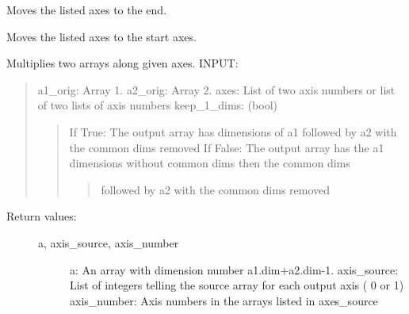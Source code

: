 \documentclass[letterpaper,10pt,english]{sphinxmanual}
\begin{document}
\begin{fulllineitems}
\label{\detokenize{tools:flap.tools.move_axes_to_end}}
Moves the listed axes to the end.

\end{fulllineitems}


\begin{fulllineitems}
\label{\detokenize{tools:flap.tools.move_axes_to_start}}
Moves the listed axes to the start axes.

\end{fulllineitems}


\begin{fulllineitems}
\label{\detokenize{tools:flap.tools.multiply_along_axes}}
Multiplies two arrays along given axes.
INPUT:
\begin{quote}

a1\_orig: Array 1.
a2\_orig: Array 2.
axes: List of two axis numbers or list of two lists of axis numbers
keep\_1\_dims: (bool)
\begin{quote}

If True: The output array has dimensions of a1 followed by a2 with the common dims removed
If False: The output array has the a1 dimensions without common dims then the common dims
\begin{quote}

followed by a2 with the common dims removed
\end{quote}
\end{quote}
\end{quote}
\begin{description}
\item[{Return values:}] \leavevmode\begin{description}
\item[{a, axis\_source, axis\_number}] \leavevmode
a: An array with dimension number a1.dim+a2.dim-1.
axis\_source: List of integers telling the source array for each output axis ( 0 or 1)
axis\_number: Axis numbers in the arrays listed in axes\_source

\end{description}

\end{description}

\end{fulllineitems}
\end{document}

